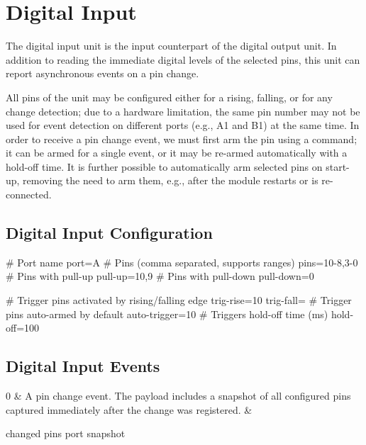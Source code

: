 \section{Digital Input}

The digital input unit is the input counterpart of the digital output unit. In addition to reading the immediate digital levels of the selected pins, this unit can report asynchronous events on a pin change. 

All pins of the unit may be configured either for a rising, falling, or for any change detection; due to a hardware limitation, the same pin number may not be used for event detection on different ports (e.g., A1 and B1) at the same time. In order to receive a pin change event, we must first arm the pin using a command; it can be armed for a single event, or it may be re-armed automatically with a hold-off time. It is further possible to automatically arm selected pins on start-up, removing the need to arm them, e.g., after the module restarts or is re-connected.

\subsection{Digital Input Configuration}

\begin{inicode}
[DI:in@2]
# Port name
port=A
# Pins (comma separated, supports ranges)
pins=10-8,3-0
# Pins with pull-up
pull-up=10,9
# Pins with pull-down
pull-down=0

# Trigger pins activated by rising/falling edge
trig-rise=10
trig-fall=
# Trigger pins auto-armed by default
auto-trigger=10
# Triggers hold-off time (ms)
hold-off=100
\end{inicode}

\subsection{Digital Input Events}

\begin{cmdlist}

	0 & 
	A pin change event. The payload includes a snapshot of all configured pins captured immediately after the change was registered.
	& \begin{cmdpld}
		 changed pins
		 port snapshot
	\end{cmdpld}

\end{cmdlist}


